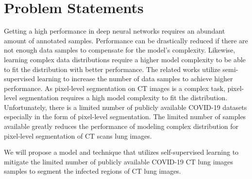 \section{Problem Statements}
Getting a high performance in deep neural networks requires an abundant amount of annotated samples. Performance can be drastically reduced if there are not enough data samples to compensate for the model’s complexity. Likewise, learning complex data distributions require a higher model complexity to be able to fit the distribution with better performance. The related works utilize semi-supervised learning to increase the number of data samples to achieve higher performance. As pixel-level segmentation on CT images is a complex task, pixel-level segmentation requires a high model complexity to fit the distribution. Unfortunately, there is a limited number of publicly available COVID-19 datasets especially in the form of pixel-level segmentation. The limited number of samples available greatly reduces the performance of modeling complex distribution for pixel-level segmentation of CT scans lung images.

We will propose a model and technique that utilizes self-supervised learning to mitigate the limited number of publicly available COVID-19 CT lung images samples to segment the infected regions of CT lung images. 
